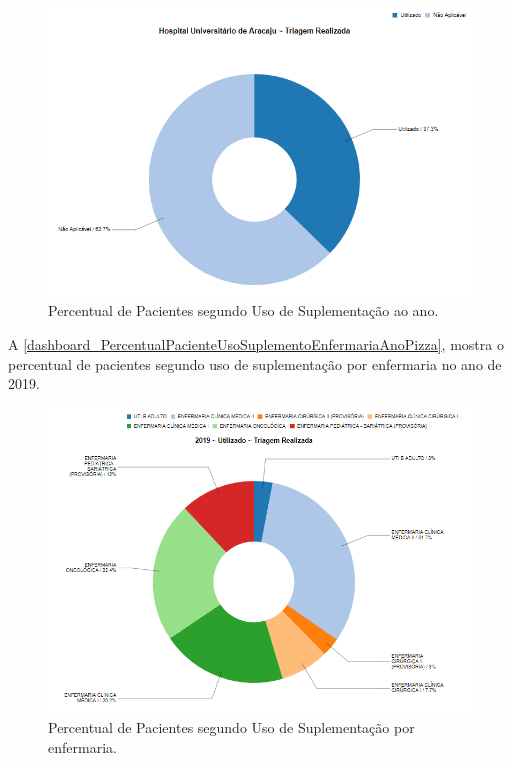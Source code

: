 \begin{figure}[htb]
	\caption{\label{dashboard_PercentualPacienteUsoSuplementoHospitalAnoPizza}Percentual de Pacientes segundo Uso de Suplementação ao ano.}
	\begin{center}
	    \includegraphics[scale=0.8]{Imagens/4.1.PercentualPacienteUsoSuplementoHospitalAnoPizza.png}
	\end{center}
\end{figure}

\newpage
A \autoref{dashboard_PercentualPacienteUsoSuplementoEnfermariaAnoPizza}, mostra o percentual de pacientes segundo uso de suplementação por enfermaria no ano de 2019.

\begin{figure}[htb]
	\caption{\label{dashboard_PercentualPacienteUsoSuplementoEnfermariaAnoPizza}Percentual de Pacientes segundo Uso de Suplementação por enfermaria.}
	\begin{center}
	    \includegraphics[scale=0.8]{Imagens/4.3.PercentualPacienteUsoSuplementoEnfermariaAnoPizza.png}
	\end{center}
\end{figure}

